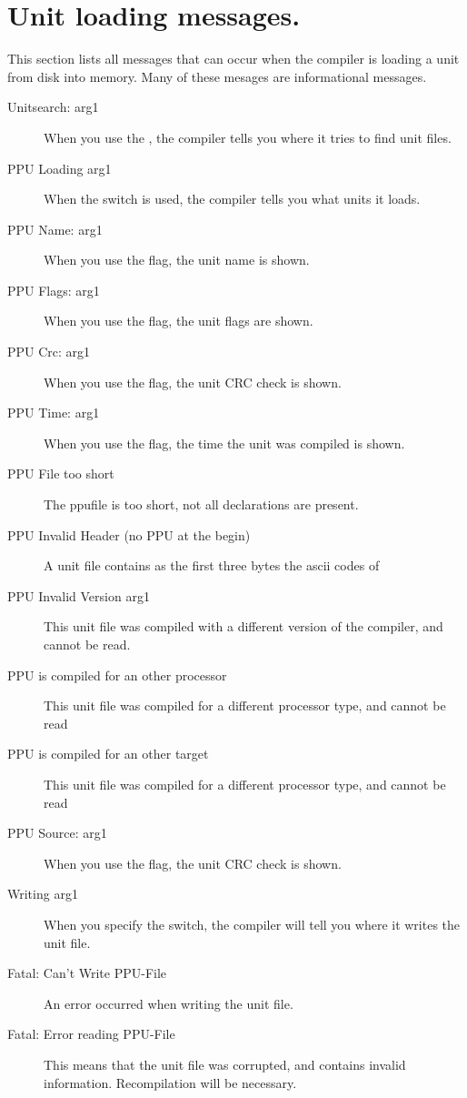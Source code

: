  \section{Unit loading messages.}
 This section lists all messages that can occur when the compiler is
 loading a unit from disk into memory. Many of these mesages are
 informational messages.
 \begin{description}
\item [Unitsearch: arg1]
 When you use the , the compiler tells you where it tries to find
 unit files.
\item [PPU Loading arg1]
 When the  switch is used, the compiler tells you
 what units it loads.
\item [PPU Name: arg1]
 When you use the  flag, the unit name is shown.
\item [PPU Flags: arg1]
 When you use the  flag, the unit flags are shown.
\item [PPU Crc: arg1]
 When you use the  flag, the unit CRC check is shown.
\item [PPU Time: arg1]
 When you use the  flag, the time the unit was compiled is shown.
\item [PPU File too short]
 The ppufile is too short, not all declarations are present.
\item [PPU Invalid Header (no PPU at the begin)]
 A unit file contains as the first three bytes the ascii codes of 
\item [PPU Invalid Version arg1]
 This unit file was compiled with a different version of the compiler, and
 cannot be read.
\item [PPU is compiled for an other processor]
 This unit file was compiled for a different processor type, and
 cannot be read
\item [PPU is compiled for an other target]
 This unit file was compiled for a different processor type, and
 cannot be read
\item [PPU Source: arg1]
 When you use the  flag, the unit CRC check is shown.
\item [Writing arg1]
 When you specify the  switch, the compiler will tell you where it
 writes the unit file.
\item [Fatal: Can't Write PPU-File]
 An error occurred when writing the unit file.
\item [Fatal: Error reading PPU-File]
 This means that the unit file was corrupted, and contains invalid
 information. Recompilation will be necessary.

\end{description}
